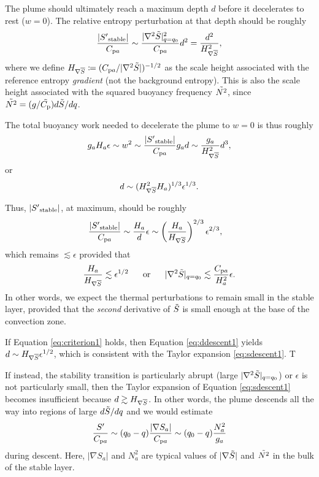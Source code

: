 \documentclass[12pt]{article}
\newcommand{\cpa}{C_{{\rm p}a}}
\newcommand{\sstable}{|\entrprime_{\rm stable}|}
\newcommand{\hdsdq}{H_{\nabla\entrover}}
\begin{document}
The plume should ultimately reach a maximum depth $d$ before it decelerates to rest ($w=0$). The relative entropy perturbation at that depth should be roughly
\begin{align}
	\frac{\sstable}{\cpa}\sim \frac{|\nabla^2\entrtilde|^2_{q=q_0}}{\cpa}d^2=\frac{d^2}{\hdsdq^2},
\end{align}
where we define $\hdsdq\define(\cpa/|\nabla^2\entrtilde|)^{-1/2}$ as the scale height associated with the reference entropy \textit{gradient} (not the background entropy). This is also the scale height associated with the squared buoyancy frequency $\tilde{N^2}$, since $\tilde{N^2}=(g/\tilde{C_{\rm{p}}})d\tilde{S}/dq$.

The total buoyancy work needed to decelerate the plume to $w=0$ is thus roughly
\begin{align}
	g_aH_a\epsilon \sim w^2 \sim \frac{\sstable}{\cpa} g_ad\sim \frac{g_a}{\hdsdq^2}d^3,
\end{align}
or 
\begin{align}\label{eq:ddescent1}
	d\sim (\hdsdq^2H_a)^{1/3}\epsilon^{1/3}.
\end{align}

Thus, $\sstable$, at maximum, should be roughly
\begin{align}\label{eq:entrpert1}
	\frac{\sstable}{\cpa} &\sim \frac{H_a}{d}\epsilon\sim \left(\frac{H_a}{\hdsdq}\right)^{2/3}\epsilon^{2/3},
\end{align}
which remains $\lesssim\epsilon$ provided that 
\begin{align}\label{eq:criterion1}
	\frac{H_a}{\hdsdq}\lesssim \epsilon^{1/2}\five\orr |\nabla^2\entrtilde|_{q=q_0}\lesssim \frac{\cpa}{H_a^2}\epsilon.
\end{align}
In other words, we expect the thermal perturbations to remain small in the stable layer, provided that the \textit{second} derivative of $\tilde{S}$ is small enough at the base of the convection zone. 

If Equation \eqref{eq:criterion1} holds, then Equation \eqref{eq:ddescent1} yields $d\sim\hdsdq\epsilon^{1/2}$, which is consistent with the Taylor expansion \eqref{eq:sdescent1}. T

 If instead, the stability transition is particularly abrupt (large $|\nabla^2\tilde{S}|_{q=q_0}$) or $\epsilon$ is not particularly small, then the Taylor expansion of Equation \eqref{eq:sdescent1} becomes insufficient because $d\gtrsim\hdsdq$. In other words, the plume descends all the way into regions of large $d\tilde{S}/dq$ and we would estimate
 \begin{align}\label{eq:sdescent2}
 		\frac{\entrprime}{\cpa}\sim(q_0-q)\frac{|\nabla S_a|}{\cpa}\sim (q_0-q)\frac{N_a^2}{g_a}
 \end{align}
 during descent. Here, $|\nabla S_a|$ and $N_a^2$ are typical values of $|\nabla\tilde{S}|$ and $\tilde{N^2}$ in the bulk of the stable layer. 
 
\end{document}
